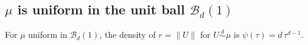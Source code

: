 \documentclass{article}
\newcommand{\Luc}{\color{magenta} }
\def\SX{{\mathscr X}}
\def\Ex{\mathsf{E}}
\def\simd{\stackrel{d}{\sim}}
\def\me{\epsilon}
\def\PP{\mathbb{P}}
\def\SB{{\mathscr B}}
\def\SS{{\mathcal S}}
\def\ub{\mathbf{u}}
\def\e1{\mathrm{e}}
\begin{document}
\subsection{$\mu$ is uniform in the unit ball $\SB_d(1)$} %
\label{S:ball}




For $\mu$ uniform in $\SB_d(1)$, the density of $r=\|U\|$ for $U\simd\mu$ is $\psi(\tau)=d\,\tau^{d-1}$.




\end{document}
